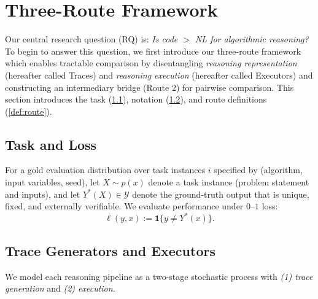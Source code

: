 \section{Three-Route Framework}
\label{sec:framework}
Our central research question (RQ) is: \emph{Is code $>$ NL for algorithmic reasoning?} To begin to answer this question, we first introduce our three-route framework which enables tractable comparison by disentangling \emph{reasoning representation} (hereafter called Traces) and \emph{reasoning execution} (hereafter called Executors) and constructing an intermediary bridge (Route 2) for pairwise comparison. This section introduces the task (\cref{def:task}), notation (\cref{def:trace}), and route definitions (\cref{def:route}).


\subsection{Task and Loss}
\label{def:task}
For a gold evaluation distribution over task instances $i$ specified by (algorithm, input variables, seed), let $X \sim p(x)$ denote a task instance (problem statement and inputs), and let $Y^*(X) \in \mathcal{Y}$ denote the ground-truth output that is unique, fixed, and externally verifiable. 
We evaluate performance under $0$--$1$ loss:
$$\ell(y,x) := \mathbf{1}\{y \neq Y^*(x)\}.$$

\subsection{Trace Generators and Executors}
\label{def:trace}
We model each reasoning pipeline as a two-stage stochastic process with \emph{(1) trace generation} and \emph{(2) execution}. 
